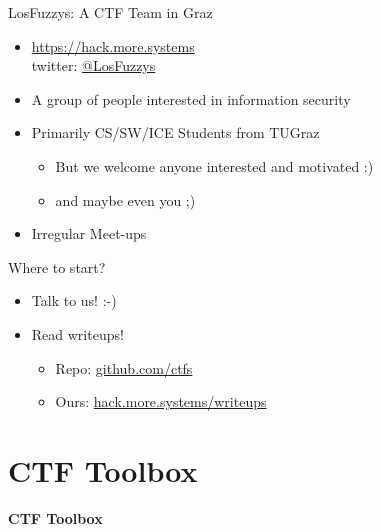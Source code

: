 \begin{frame}
  {LosFuzzys: A CTF Team in Graz}

  \begin{itemize}
    \item \url{https://hack.more.systems}
      \\ twitter: \href{https://twitter.com/LosFuzzys}{@LosFuzzys}
    \item A group of people interested in information security
    \item Primarily CS/SW/ICE Students from TUGraz
      \begin{itemize}
        \item But we welcome anyone interested and motivated :)
        \item and maybe even you ;)
      \end{itemize}
    \item Irregular Meet-ups
  \end{itemize}
\end{frame}

\begin{frame}
	{Where to start?}

	\begin{itemize}
		\item Talk to us! :-)
	\end{itemize}

	\begin{itemize}
		\item Read writeups!
		\begin{itemize}
			\item Repo: \href{https://github.com/ctfs}{github.com/ctfs}
			\item Ours: \href{https://hack.more.systems/writeups}{hack.more.systems/writeups}
		\end{itemize}
	\end{itemize}

\end{frame}


\section{CTF Toolbox}

{
\begin{frame}[plain]

  \begin{center}
    {\Huge \hspace*{\fill} \textbf{CTF Toolbox}}

    \vspace{17em}
  \end{center}
\end{frame}
}

